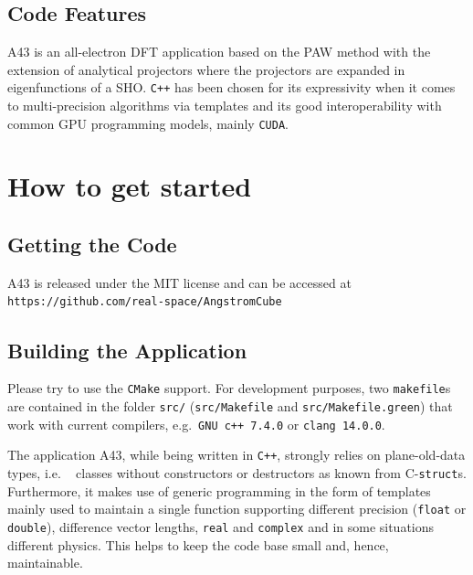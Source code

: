 \documentclass[oribibl]{llncs}
\newcommand{\ttt}[1]{\texttt{#1}}
\newcommand{\codename}{A43}
\begin{document}
\subsection{Code Features} \label{sec:features}
%
\codename{} is an all-electron \ac{DFT} application 
based on the \ac{PAW} method \cite{PhysRevB.50.17953} %
with the extension of analytical projectors \cite{BaumeisterTsukamoto2019}
where the projectors are expanded in eigenfunctions of a \ac{SHO}.
\ttt{C++} has been chosen for its expressivity
when it comes to multi-precision algorithms via templates
and its good interoperability with common \ac{GPU} programming models, mainly \ttt{CUDA}.


\newpage
\section{How to get started} \label{sec:how-to-get-started}
%
\subsection{Getting the Code} \label{sec:getting-the-code}
\codename{} is released under the MIT license and can be accessed at \\
\ttt{https://github.com/real-space/AngstromCube} 

\subsection{Building the Application} \label{sec:compiling}
%
Please try to use the \ttt{CMake} support.
For development purposes, two \ttt{makefile}s are contained in the folder \ttt{src/} (\ttt{src/Makefile} and \ttt{src/Makefile.green}) that work with current compilers, e.g.~\ttt{GNU c++ 7.4.0} or \ttt{clang 14.0.0}.

\noindent
The application \codename{}, while being written in \ttt{C++}, strongly relies on plane-old-data types,
i.e. ~ classes without constructors or destructors as known from C-\ttt{struct}s.
Furthermore, it makes use of generic programming in the form of templates
mainly used to maintain a single function supporting different precision (\ttt{float} or \ttt{double}), 
difference vector lengths, \ttt{real} and \ttt{complex} and in some situations different physics.
This helps to keep the code base small and, hence, maintainable.
\end{document}
